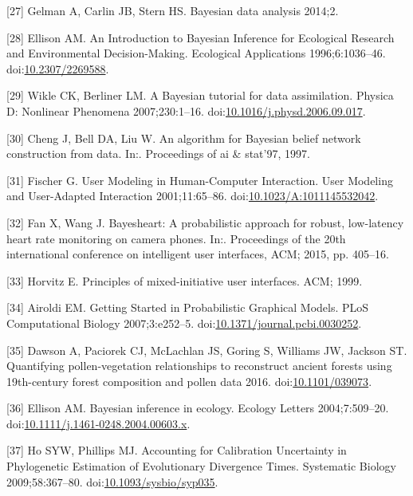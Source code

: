 \documentclass[]{article}
\begin{document}
\hypertarget{ref-Andrew:2013un}{}
{[}27{]} Gelman A, Carlin JB, Stern HS. Bayesian data analysis 2014;2.

\hypertarget{ref-Ellison:1996js}{}
{[}28{]} Ellison AM. An Introduction to Bayesian Inference for
Ecological Research and Environmental Decision-Making. Ecological
Applications 1996;6:1036--46.
doi:\href{https://doi.org/10.2307/2269588}{10.2307/2269588}.

\hypertarget{ref-Wikle:2007dy}{}
{[}29{]} Wikle CK, Berliner LM. A Bayesian tutorial for data
assimilation. Physica D: Nonlinear Phenomena 2007;230:1--16.
doi:\href{https://doi.org/10.1016/j.physd.2006.09.017}{10.1016/j.physd.2006.09.017}.

\hypertarget{ref-Cheng:1997wg}{}
{[}30{]} Cheng J, Bell DA, Liu W. An algorithm for Bayesian belief
network construction from data. In:. Proceedings of ai \& stat'97, 1997.

\hypertarget{ref-Fischer:2001jl}{}
{[}31{]} Fischer G. User Modeling in Human-Computer Interaction. User
Modeling and User-Adapted Interaction 2001;11:65--86.
doi:\href{https://doi.org/10.1023/A:1011145532042}{10.1023/A:1011145532042}.

\hypertarget{ref-Fan:2015du}{}
{[}32{]} Fan X, Wang J. Bayesheart: A probabilistic approach for robust,
low-latency heart rate monitoring on camera phones. In:. Proceedings of
the 20th international conference on intelligent user interfaces, ACM;
2015, pp. 405--16.

\hypertarget{ref-Anonymous:XBUc-RmI}{}
{[}33{]} Horvitz E. Principles of mixed-initiative user interfaces. ACM;
1999.

\hypertarget{ref-Airoldi:2007br}{}
{[}34{]} Airoldi EM. Getting Started in Probabilistic Graphical Models.
PLoS Computational Biology 2007;3:e252--5.
doi:\href{https://doi.org/10.1371/journal.pcbi.0030252}{10.1371/journal.pcbi.0030252}.

\hypertarget{ref-Dawson:2016wa}{}
{[}35{]} Dawson A, Paciorek CJ, McLachlan JS, Goring S, Williams JW,
Jackson ST. Quantifying pollen-vegetation relationships to reconstruct
ancient forests using 19th-century forest composition and pollen data
2016. doi:\href{https://doi.org/10.1101/039073}{10.1101/039073}.

\hypertarget{ref-Ellison:2004fj}{}
{[}36{]} Ellison AM. Bayesian inference in ecology. Ecology Letters
2004;7:509--20.
doi:\href{https://doi.org/10.1111/j.1461-0248.2004.00603.x}{10.1111/j.1461-0248.2004.00603.x}.

\hypertarget{ref-Ho:2009gn}{}
{[}37{]} Ho SYW, Phillips MJ. Accounting for Calibration Uncertainty in
Phylogenetic Estimation of Evolutionary Divergence Times. Systematic
Biology 2009;58:367--80.
doi:\href{https://doi.org/10.1093/sysbio/syp035}{10.1093/sysbio/syp035}.
\end{document}
